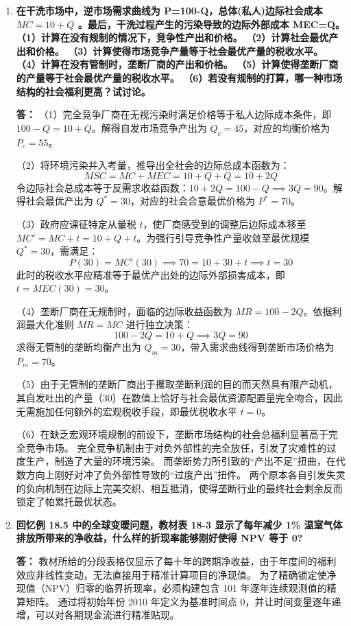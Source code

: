\begin{enumerate}[label=\textbf{\arabic*.}, leftmargin=*]
		\item \textbf{在干洗市场中，逆市场需求曲线为 P=100-Q，总体(私人)边际社会成本 $MC=10+Q$ 。最后，干洗过程产生的污染导致的边际外部成本 MEC=Q。
			（1）计算在没有规制的情况下，竞争性产出和价格。
			（2）计算社会最优产出和价格。
			（3）计算使得市场竞争产量等于社会最优产量的税收水平。
			（4）计算在没有管制时，垄断厂商的产出和价格。
			（5）计算使得垄断厂商的产量等于社会最优产量的税收水平。
			（6）若没有规制的打算，哪一种市场结构的社会福利更高？试讨论。}
		
		\textbf{答：} （1）完全竞争厂商在无视污染时满足价格等于私人边际成本条件，即 $100 - Q = 10 + Q$。解得自发市场竞争产出为 $Q_c = 45$，对应的均衡价格为 $P_c = 55$。
		
		（2）将环境污染并入考量，推导出全社会的边际总成本函数为：
		\[
		MSC = MC + MEC = 10 + Q + Q = 10 + 2Q
		\]
		令边际社会总成本等于反需求收益函数：$10 + 2Q = 100 - Q \implies 3Q = 90$。解得社会最优产出为 $Q^* = 30$，对应的社会合意最优价格为 $P^* = 70$。
		
		（3）政府应课征特定从量税 $t$，使厂商感受到的调整后边际成本移至 $MC' = MC + t = 10 + Q + t$。为强行引导竞争性产量收敛至最优规模 $Q^* = 30$，需满足：
		\[
		P(30) = MC'(30) \implies 70 = 10 + 30 + t \implies t = 30
		\]
		此时的税收水平应精准等于最优产出处的边际外部损害成本，即 $t = MEC(30) = 30$。
		
		（4）垄断厂商在无规制时，面临的边际收益函数为 $MR = 100 - 2Q$。依据利润最大化准则 $MR = MC$ 进行独立决策：
		\[
		100 - 2Q = 10 + Q \implies 3Q = 90
		\]
		求得无管制的垄断均衡产出为 $Q_m = 30$，带入需求曲线得到垄断市场价格为 $P_m = 70$。
		
		（5）由于无管制的垄断厂商出于攫取垄断利润的目的而天然具有限产动机，其自发吐出的产量（30）在数值上恰好与社会最优资源配置量完全吻合，因此无需施加任何额外的宏观税收手段，即最优税收水平 $t = 0$。
		
		（6）在缺乏宏观环境规制的前设下，垄断市场结构的社会总福利显著高于完全竞争市场。
		完全竞争机制由于对负外部性的完全放任，引发了灾难性的过度生产，制造了大量的环境污染。
		而垄断势力所引致的“产出不足”扭曲，在代数方向上刚好对冲了负外部性导致的“过度产出”扭件。
		两个原本各自引发失灵的负向机制在边际上完美交织、相互抵消，使得垄断行业的最终社会剩余反而锁定了帕累托最优状态。
		
		\item \textbf{回忆例 18.5 中的全球变暖问题，教材表 18-3 显示了每年减少 1\% 温室气体排放所带来的净收益，什么样的折现率能够刚好使得 NPV 等于 0?}
		
		\textbf{答：} 教材所给的分段表格仅显示了每十年的跨期净收益，由于年度间的福利效应非线性变动，无法直接用于精准计算项目的净现值。
		为了精确锁定使净现值（NPV）归零的临界折现率，必须构建包含 101 年逐年连续观测值的精算矩阵。
		通过将初始年份 2010 年定义为基准时间点 0，并让时间变量逐年递增，可以对各期现金流进行精准贴现。
		

\end{enumerate}
